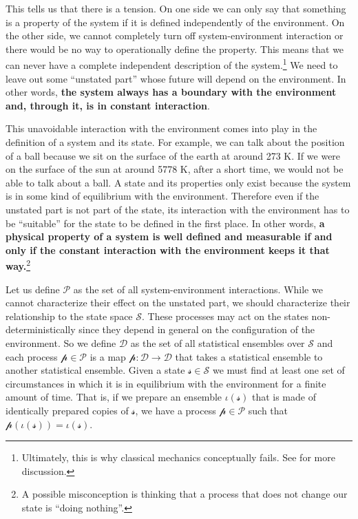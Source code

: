 \documentclass[applsci,article,submit,moreauthors,pdftex]{Definitions/mdpi}
\begin{document}
This tells us that there is a tension. On one side we can only say that something is a property of the system if it is defined independently of the environment. On the other side, we cannot completely turn off system-environment interaction or there would be no way to operationally define the property. This means that we can never have a complete independent description of the system.\footnote{Ultimately, this is why classical mechanics conceptually fails. See \cite{Carc1} for more discussion.} We need to leave out some ``unstated part'' whose future will depend on the environment. In other words, \textbf{the system always has a boundary with the environment and, through it, is in constant interaction}.

This unavoidable interaction with the environment comes into play in the definition of a system and its state. For example, we can talk about the position of a ball because we sit on the surface of the earth at around 273 K. If we were on the surface of the sun at around 5778 K, after a short time, we would not be able to talk about a ball. A state and its properties only exist because the system is in some kind of equilibrium with the environment. Therefore even if the unstated part is not part of the state, its interaction with the environment has to be ``suitable'' for the state to be defined in the first place. In other words, \textbf{a physical property of a system is well defined and measurable if and only if the constant interaction with the environment keeps it that way.}\footnote{A possible misconception is thinking that a process that does not change our state is ``doing nothing''.}

Let us define $\mathcal{P}$ as the set of all system-environment interactions. While we cannot characterize their effect on the unstated part, we should characterize their relationship to the state space $\mathcal{S}$. These processes may act on the states non-deterministically since they depend in general on the configuration of the environment. So we define $\mathcal{D}$ as the set of all statistical ensembles over $\mathcal{S}$ and each process $\mathcal{p} \in \mathcal{P}$ is a map $\mathcal{p} : \mathcal{D} \to \mathcal{D}$ that takes a statistical ensemble to another statistical ensemble. Given a state $\mathcal{s} \in \mathcal{S}$ we must find at least one set of circumstances in which it is in equilibrium with the environment for a finite amount of time. That is, if we prepare an ensemble $\iota(\mathcal{s})$ that is made of identically prepared copies of $\mathcal{s}$, we have a process $\mathcal{p} \in \mathcal{P}$ such that $\mathcal{p}(\iota(\mathcal{s})) = \iota(\mathcal{s})$.
\end{document}
